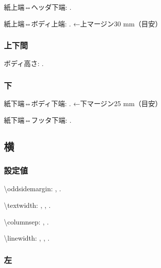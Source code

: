 \documentclass{FITpaper}
\begin{document}
紙上端⇔ヘッダ下端:
\prntlen{\mytop}.

\addtolength{\mytop}{\headsep}

紙上端⇔ボディ上端:
\prntlen{\mytop}.
←上マージン30 mm（目安）

\subsubsection{上下間}

ボディ高さ:
\prntlen{\textheight}.

\subsubsection{下}

\newlength{\mybottom}
\setlength\mybottom{\paperheight}

\addtolength{\mybottom}{-\mytop}
\addtolength{\mybottom}{-\textheight}

紙下端⇔ボディ下端:
\prntlen{\mybottom}.
←下マージン25 mm（目安）

\addtolength\mybottom{-\footskip}

紙下端⇔フッタ下端:
\prntlen{\mybottom}.

\subsection{横}

\subsubsection{設定値}

\textbackslash oddsidemargin:
\prntlen{\oddsidemargin},
\prntlen{\oddsidemargin}.

\textbackslash textwidth:
\prntlen{\textwidth},
\prntlen{\textwidth},
\prntlen{\textwidth}.

\textbackslash columnsep:
\prntlen{\columnsep},
\prntlen{\columnsep}.

\textbackslash linewidth:
\prntlen{\linewidth},
\prntlen{\linewidth},
\prntlen{\linewidth}.

\subsubsection{左}
\end{document}
